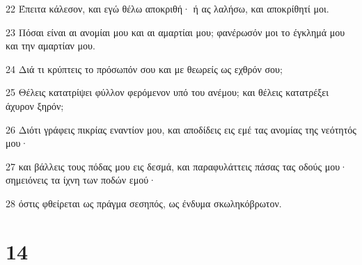 \par 22 Έπειτα κάλεσον, και εγώ θέλω αποκριθή· ή ας λαλήσω, και αποκρίθητί μοι.
\par 23 Πόσαι είναι αι ανομίαι μου και αι αμαρτίαι μου; φανέρωσόν μοι το έγκλημά μου και την αμαρτίαν μου.
\par 24 Διά τι κρύπτεις το πρόσωπόν σου και με θεωρείς ως εχθρόν σου;
\par 25 Θέλεις κατατρίψει φύλλον φερόμενον υπό του ανέμου; και θέλεις κατατρέξει άχυρον ξηρόν;
\par 26 Διότι γράφεις πικρίας εναντίον μου, και αποδίδεις εις εμέ τας ανομίας της νεότητός μου·
\par 27 και βάλλεις τους πόδας μου εις δεσμά, και παραφυλάττεις πάσας τας οδούς μου· σημειόνεις τα ίχνη των ποδών εμού·
\par 28 όστις φθείρεται ως πράγμα σεσηπός, ως ένδυμα σκωληκόβρωτον.

\chapter{14}

